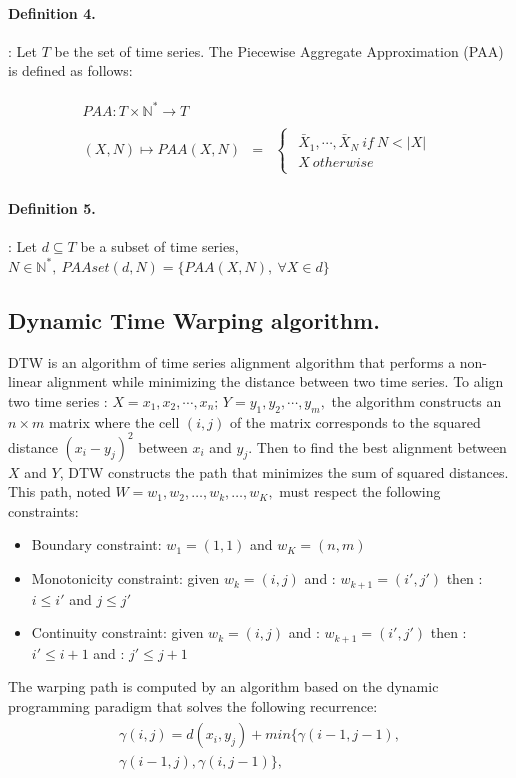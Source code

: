 \paragraph{Definition 4.}:
Let $T$ be the set of time series. The Piecewise Aggregate Approximation (PAA) is defined as follows:

\begin{eqnarray}
\begin{array}{ccc}
 PAA: T\times\mathbb{N^{*}}\rightarrow T\\
\\
(X,N)\mapsto PAA(X,N) & = &
 \begin{cases}
 \begin{array}{c}
\bar{X}_{1},\cdots,\bar{X}_{N}\:if\:N<|X|\\
X\:otherwise
\end{array}
\end{cases}
\end{array}
\end{eqnarray}


\paragraph{Definition 5.}:
Let $d\subseteq T$ be a subset of time series,
$N\in\mathbb{N}^{*},\:PAAset(d,N)=\{PAA(X,N),\:\forall X\in d\}$


\subsection{Dynamic Time Warping algorithm.}
DTW \cite{sakoe1978dynamic} is an algorithm of time series alignment
algorithm that  performs a non-linear alignment while
minimizing the distance between two time series. To align two time series : 
$X=x_{1},x_{2},\cdots,x_{n};\,
Y=y_{1},y_{2},\cdots,y_{m},$ the algorithm constructs an  $n\times m$  matrix where the cell $(i,
j)$ of the matrix corresponds to the squared distance $(x_{i}-y_{j})^{2}$ between $x_{i}$
and $y_{j}$. Then to find the best alignment between $X$ and $Y$, DTW constructs the path that minimizes the sum of squared distances. This path, noted
$W = w_1, w_2, \ldots, w_k, \ldots, w_K,$ must respect the following constraints:
\begin{itemize}
  \item Boundary constraint: $w_1 = (1, 1)$ and  $w_K = (n, m)$
  \item Monotonicity constraint: given $w_k = (i, j)$ and :  $w_{k + 1} =
  (i',j')$ then : $i \leq i'$ and $j \leq j'$
 \item Continuity constraint: given $w_k = (i, j)$ and :   $w_{k + 1} = (i', j')$
 then : $i' \leq i + 1$ and : $j' \leq j + 1$
\end{itemize}
The warping path is computed by  an algorithm based on the dynamic
programming paradigm that solves the following recurrence:
\begin{eqnarray}
\begin{array}{l}
\gamma(i,j)=d(x_{i},y_{j}) + min\{\gamma(i-1, j-1), \\
\gamma(i-1, j),\gamma(i, j-1)\},
\end{array}
\end{eqnarray}


